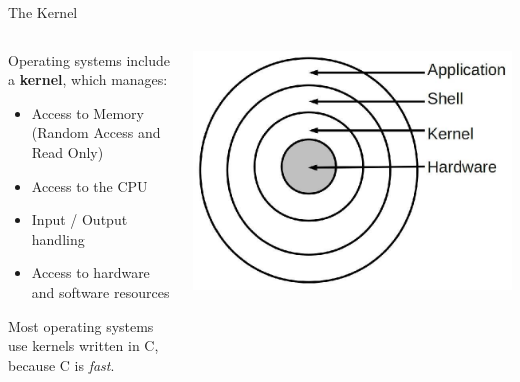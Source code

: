 \documentclass[11pt]{beamer}
\begin{document}
\begin{frame}{The Kernel}
\begin{columns}
\begin{column}{0.5\textwidth}
Operating systems include a \textbf{kernel}, which manages:
\begin{itemize}
\item Access to Memory (Random Access and Read Only)
\item Access to the CPU
\item Input / Output handling
\item Access to hardware and software resources
\end{itemize}
Most operating systems use kernels written in C, because C is \emph{fast}.
\end{column}
\begin{column}{0.5\textwidth}
\includegraphics[scale=0.2]{shells.png}
\end{column}
\end{columns}
\end{frame}
\end{document}
